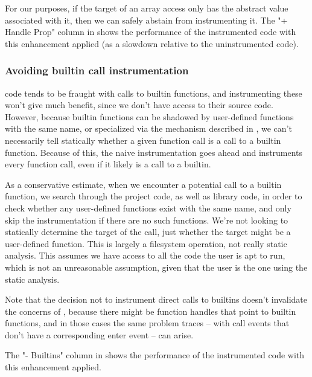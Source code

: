For our purposes, if the target of an array access only has the 
abstract value associated with it, then we can safely abstain from
instrumenting it. The "+ Handle Prop" column in
 shows the performance of the
instrumented code with this enhancement applied (as a slowdown relative to
the uninstrumented code).


\subsubsection{Avoiding builtin call instrumentation}

\matlab code tends to be fraught with calls to builtin functions, and
instrumenting these won't give much benefit, since we don't have access to
their source code. However, because \matlab builtin functions can be shadowed
by user-defined functions with the same name, or specialized via the mechanism
described in , we can't necessarily tell statically
whether a given function call is a call to a builtin function. Because of this,
the naive instrumentation goes ahead and instruments every function call, even
if it likely is a call to a builtin.

As a conservative estimate, when we encounter a potential call to a builtin
function, we search through the project code, as well as library code, in
order to check whether any user-defined functions exist with the same name,
and only skip the instrumentation if there are no such functions. We're not
looking to statically determine the target of the call, just whether the
target might be a user-defined function. This is largely a filesystem
operation, not really static analysis. This assumes we have access to all the
code the user is apt to run, which is not an unreasonable assumption, given
that the user is the one using the static analysis.

Note that the decision not to instrument direct calls to builtins doesn't
invalidate the concerns of , because there
might be function handles that point to builtin functions, and in those
cases the same problem traces -- with call events that don't have a
corresponding enter event -- can arise.

The "- Builtins" column in  shows the
performance of the instrumented code with this enhancement applied.

